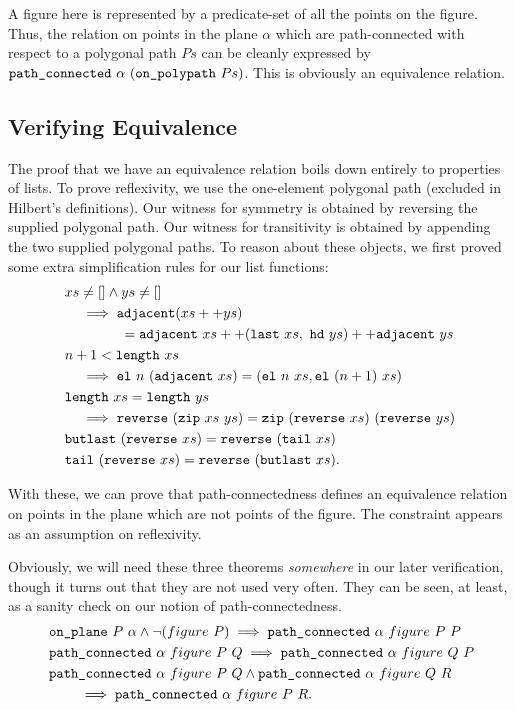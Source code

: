 A figure here is represented by a predicate-set of all the points on the figure. Thus, the relation on points in the plane $\alpha$ which are path-connected with respect to a polygonal path $Ps$ can be cleanly expressed by $\code{path\_connected}\ \alpha\ (\code{on\_polypath}\ Ps)$. This is obviously an equivalence relation.

\subsection{Verifying Equivalence}\label{sec:segConnectEquivalence}
The proof that we have an equivalence relation boils down entirely to properties of lists. To prove reflexivity, we use the one-element polygonal path (excluded in Hilbert's definitions). Our witness for symmetry is obtained by reversing the supplied polygonal path. Our witness for transitivity is obtained by appending the two supplied polygonal paths. To reason about these objects, we first proved some extra simplification rules for our list functions:
\begin{align*}
  &xs \neq [] \wedge ys \neq []\\ 
  &\quad\implies\code{adjacent}(\append{xs}{ys})\\
  &\qquad\qquad = \append{\append{\code{adjacent}\ xs}{(\code{last}\ xs,\ \code{hd}\ ys)}}{\code{adjacent}\ ys}\\
  &n + 1 < \code{length}\ xs\\
  &\quad\implies \el{n}{(\code{adjacent}\ xs)} = (\el{n}{xs}, \el{(n+1)}{xs})\\
  &\code{length}\ xs = \code{length}\ ys\\
  &\quad\implies\code{reverse}\ (\code{zip}\ xs\ ys) = \code{zip}\ (\code{reverse}\ xs)\ (\code{reverse}\ ys)\\
  &\code{butlast}\ (\code{reverse}\ xs) = \code{reverse}\ (\code{tail}\ xs)\\
  &\code{tail}\ (\code{reverse}\ xs) = \code{reverse}\ (\code{butlast}\ xs).
\end{align*}

With these, we can prove that path-connectedness defines an equivalence relation on points in the plane which are not points of the figure. The constraint appears as an assumption on reflexivity. 

Obviously, we will need these three theorems \emph{somewhere} in our later verification, though it turns out that they are not used very often. They can be seen, at least, as a sanity check on our notion of path-connectedness.
\begin{align*}
  \;&\texttt{on\_plane}\ P\ \alpha \wedge \neg(figure\ P) \implies \texttt{path\_connected}\ \alpha\ figure\ P\ P\\
  \;&\texttt{path\_connected}\ \alpha\ figure\ P\ Q \implies \texttt{path\_connected}\ \alpha\ figure\ Q\ P\\
  \;&\texttt{path\_connected}\ \alpha\ figure\ P\ Q \wedge \texttt{path\_connected}\ \alpha\ figure\ Q\ R\\
  &\qquad\implies \texttt{path\_connected}\ \alpha\ figure\ P\ R.
\end{align*}

